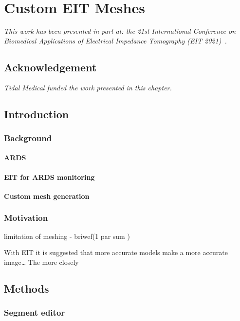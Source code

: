 \chapter{Custom EIT Meshes}
\label{chap:chapter-5}

\emph{This work has been presented in part at: 
 the 21st International Conference on Biomedical 
 Applications of Electrical Impedance Tomography (EIT 2021)~\parencite{stowe_generating_2021}.} 

\section*{Acknowledgement}
\emph{Tidal Medical funded the work presented in this chapter.}

\section{Introduction}


\subsection{Background}
\subsubsection{ARDS}
\subsubsection{EIT for ARDS monitoring}
\subsubsection{Custom mesh generation}
\subsection{Motivation}

limitation  of meshing - briwef(1 par sum )

With EIT it is suggested that more accurate models make a more accurate image\dots
The more closely 

\section{Methods}

\subsection{Segment editor}
